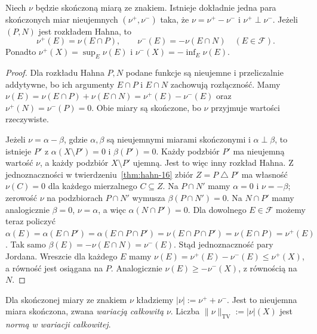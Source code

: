 \begin{twierdzenie}
\label{thm:jordan-16}
Niech $\nu$ będzie skończoną miarą ze znakiem.
Istnieje dokładnie jedna para skończonych miar nieujemnych
$(\nu^+,\nu^-)$ taka, że
$\nu=\nu^+-\nu^-$ i $\nu^+\perp\nu^-$.
Jeżeli $(P,N)$ jest rozkładem Hahna, to
\[
\nu^+(E)=\nu(E\cap P),\qquad
\nu^-(E)=-\nu(E\cap N)\quad(E\in\mathcal F).
\]
Ponadto $\nu^+(X)=\sup_E\nu(E)$ i
$\nu^-(X)=-\inf_E\nu(E)$.
\end{twierdzenie}
\begin{proof}
Dla rozkładu Hahna $P,N$ podane funkcje
są nieujemne i przeliczalnie addytywne, bo ich
argumenty $E\cap P$ i $E\cap N$ zachowują rozłączność.
Mamy $\nu(E)=\nu(E\cap P)+\nu(E\cap N)
=\nu^+(E)-\nu^-(E)$ oraz
$\nu^+(N)=\nu^-(P)=0$. Obie miary są skończone,
bo $\nu$ przyjmuje wartości rzeczywiste.

Jeżeli $\nu=\alpha-\beta$, gdzie $\alpha,\beta$ są
nieujemnymi miarami skończonymi i $\alpha\perp\beta$,
to istnieje $P'$ z $\alpha(X\setminus P')=0$
i $\beta(P')=0$. Każdy podzbiór $P'$ ma nieujemną
wartość $\nu$, a każdy podzbiór $X\setminus P'$ ujemną.
Jest to więc inny rozkład Hahna. Z jednoznaczności
w twierdzeniu~\ref{thm:hahn-16} zbiór
$Z=P\mathbin\triangle P'$ ma własność $\nu(C)=0$
dla każdego mierzalnego $C\subseteq Z$.
Na $P\cap N'$ mamy $\alpha=0$ i $\nu=-\beta$;
zerowość $\nu$ na podzbiorach $P\cap N'$ wymusza
$\beta(P\cap N')=0$. Na $N\cap P'$ mamy analogicznie
$\beta=0$, $\nu=\alpha$, a więc
$\alpha(N\cap P')=0$. Dla dowolnego $E\in\mathcal F$
możemy teraz policzyć
$\alpha(E)=\alpha(E\cap P')=\alpha(E\cap P\cap P')
=\nu(E\cap P\cap P')=\nu(E\cap P)=\nu^+(E)$.
Tak samo $\beta(E)=-\nu(E\cap N)=\nu^-(E)$.
Stąd jednoznaczność pary Jordana.
Wreszcie dla każdego $E$ mamy
$\nu(E)=\nu^+(E)-\nu^-(E)\le\nu^+(X)$,
a równość jest osiągana na $P$. Analogicznie
$\nu(E)\ge-\nu^-(X)$, z równością na $N$.
\end{proof}

\begin{definicja}
\label{def:variation-signed-16}
Dla skończonej miary ze znakiem $\nu$ kładziemy
$|\nu|:=\nu^++\nu^-$. Jest to nieujemna miara
skończona, zwana \emph{wariacją całkowitą} $\nu$.
Liczba $\|\nu\|_{\mathrm{TV}}:=|\nu|(X)$ jest
\emph{normą w wariacji całkowitej}.
\end{definicja}

